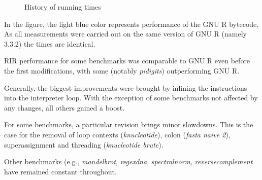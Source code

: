 \begin{figure}[htbp]
  \caption{\label{fig:history}History of running times}
  \centering
\end{figure}

In the figure, the light blue color represents performance of the GNU R bytecode. As all measurements were carried out on the same version of GNU R (namely 3.3.2) the times are identical.

RIR performance for some benchmarks was comparable to GNU R even before the first modifications, with some (notably \emph{pidigits}) outperforming GNU R.


Generally, the biggest improvements were brought by inlining the instructions into the interpreter loop. With the exception of some benchmarks not affected by any changes, all others gained a boost.


For some benchmarks, a particular revision brings minor slowdowns. This is the case for the removal of loop contexts (\emph{knucleotide}), colon (\emph{fasta naive 2}), superassignment and threading (\emph{knucleotide brute}).


Other benchmarks (e.g., \emph{mandelbrot}, \emph{regexdna}, \emph{spectralnorm}, \emph{reversecomplement} have remained constant throughout.


